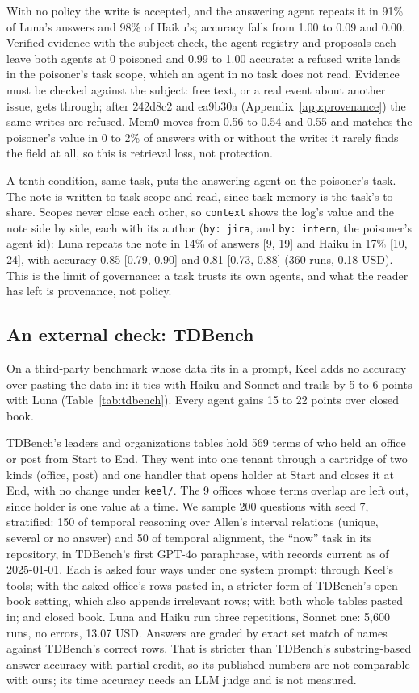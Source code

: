 \documentclass{article}
\newcommand{\code}[1]{\texttt{#1}}
\begin{document}
With no policy the write is accepted, and the answering agent repeats it in 91\% of Luna's answers and 98\% of Haiku's; accuracy falls from 1.00 to 0.09 and 0.00. Verified evidence with the subject check, the agent registry and proposals each leave both agents at 0 poisoned and 0.99 to 1.00 accurate: a refused write lands in the poisoner's task scope, which an agent in no task does not read. Evidence must be checked against the subject: free text, or a real event about another issue, gets through; after 242d8c2 and ea9b30a (Appendix~\ref{app:provenance}) the same writes are refused. Mem0 moves from 0.56 to 0.54 and 0.55 and matches the poisoner's value in 0 to 2\% of answers with or without the write: it rarely finds the field at all, so this is retrieval loss, not protection.

A tenth condition, same-task, puts the answering agent on the poisoner's task. The note is written to task scope and read, since task memory is the task's to share. Scopes never close each other, so \code{context} shows the log's value and the note side by side, each with its author (\code{by:~jira}, and \code{by:~intern}, the poisoner's agent id): Luna repeats the note in 14\% of answers [9, 19] and Haiku in 17\% [10, 24], with accuracy 0.85 [0.79, 0.90] and 0.81 [0.73, 0.88] (360 runs, 0.18 USD). This is the limit of governance: a task trusts its own agents, and what the reader has left is provenance, not policy.

\subsection{An external check: TDBench}
\label{sec:tdbench}

On a third-party benchmark whose data fits in a prompt, Keel adds no accuracy over pasting the data in: it ties with Haiku and Sonnet and trails by 5 to 6 points with Luna (Table~\ref{tab:tdbench}). Every agent gains 15 to 22 points over closed book.

TDBench's leaders and organizations tables hold 569 terms of who held an office or post from Start to End. They went into one tenant through a cartridge of two kinds (office, post) and one handler that opens holder at Start and closes it at End, with no change under \code{keel/}. The 9 offices whose terms overlap are left out, since holder is one value at a time. We sample 200 questions with seed 7, stratified: 150 of temporal reasoning over Allen's interval relations (unique, several or no answer) and 50 of temporal alignment, the ``now'' task in its repository, in TDBench's first GPT-4o paraphrase, with records current as of 2025-01-01. Each is asked four ways under one system prompt: through Keel's tools; with the asked office's rows pasted in, a stricter form of TDBench's open book setting, which also appends irrelevant rows; with both whole tables pasted in; and closed book. Luna and Haiku run three repetitions, Sonnet one: 5,600 runs, no errors, 13.07 USD. Answers are graded by exact set match of names against TDBench's correct rows. That is stricter than TDBench's substring-based answer accuracy with partial credit, so its published numbers are not comparable with ours; its time accuracy needs an LLM judge and is not measured.
\end{document}
